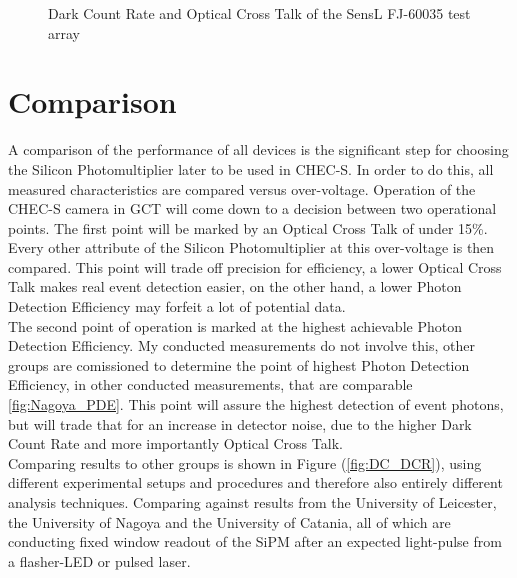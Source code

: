 \documentclass[12pt,article,type=msc,colorback,accentcolor=tud9c]{tudthesis}
\begin{document}
\begin{figure}[h]
\begin{centering}
\caption{Dark Count Rate and Optical Cross Talk of the SensL FJ-60035 test array}
\label{fig:SensL_DCROCT}
\end{centering}
\end{figure}







\clearpage
\section{\Large Comparison}
\label{sec:comparison}
A comparison of the performance of all devices is the significant step for choosing the Silicon Photomultiplier later to be used in CHEC-S. In order to do this, all measured characteristics are compared versus over-voltage. Operation of the CHEC-S camera in GCT will come down to a decision between two operational points. The first point will be marked by an Optical Cross Talk of under 15\%. Every other attribute of the Silicon Photomultiplier at this over-voltage is then compared. This point will trade off precision for efficiency, a lower Optical Cross Talk makes real event detection easier, on the other hand, a lower Photon Detection Efficiency may forfeit a lot of potential data.\\
The second point of operation is marked at the highest achievable Photon Detection Efficiency. My conducted measurements do not involve this, other groups are comissioned to determine the point of highest Photon Detection Efficiency, in other conducted measurements, that are comparable \ref{fig:Nagoya_PDE}. This point will assure the highest detection of event photons, but will trade that for an increase in detector noise, due to the higher Dark Count Rate and more importantly Optical Cross Talk.\\
Comparing results to other groups is shown in Figure (\ref{fig:DC_DCR}), using different experimental setups and procedures and therefore also entirely different analysis techniques. Comparing against results from the University of Leicester, the University of Nagoya and the University of Catania, all of which are conducting fixed window readout of the SiPM after an expected light-pulse from a flasher-LED or pulsed laser. 
\end{document}
